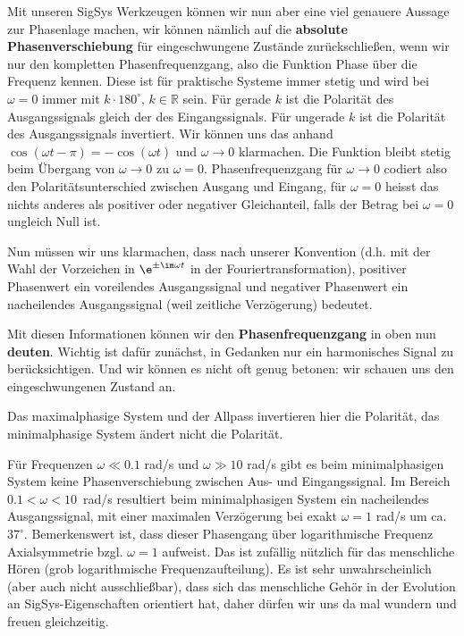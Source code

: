 \begin{Loesung}
Mit unseren SigSys Werkzeugen können wir nun aber eine viel genauere Aussage zur
Phasenlage machen, wir können nämlich auf die \textbf{absolute Phasenverschiebung}
für eingeschwungene Zustände zurückschließen, wenn wir nur den
kompletten Phasenfrequenzgang, also die Funktion Phase über die Frequenz kennen.
Diese ist für praktische Systeme immer stetig und wird bei $\omega=0$ immer mit
$k \cdot 180^\circ$, $k\in\mathbb{R}$ sein. Für gerade $k$ ist die Polarität
des Ausgangssignals gleich der des Eingangssignals. Für ungerade $k$ ist die
Polarität des Ausgangssignals invertiert.
Wir können uns das anhand $\cos(\omega t - \pi) = -\cos(\omega t)$ und $\omega\to 0$
klarmachen. Die Funktion bleibt stetig beim Übergang von $\omega\to 0$ zu $\omega=0$.
Phasenfrequenzgang für $\omega\to 0$ codiert also den Polaritätsunterschied
zwischen Ausgang und Eingang, für $\omega=0$ heisst das nichts anderes als
positiver oder negativer Gleichanteil, falls der Betrag bei $\omega=0$
ungleich Null ist.

Nun müssen wir uns klarmachen, dass nach unserer Konvention (d.h. mit der Wahl der
Vorzeichen in $\e^{\pm \im \omega t}$ in der Fouriertransformation),
positiver Phasenwert ein voreilendes Ausgangssignal und negativer Phasenwert
ein nacheilendes Ausgangssignal (weil zeitliche Verzögerung) bedeutet.

Mit diesen Informationen können wir den \textbf{Phasenfrequenzgang} in
 oben nun \textbf{deuten}. Wichtig ist dafür zunächst,
in Gedanken nur ein harmonisches Signal zu berücksichtigen.
Und wir können es nicht oft genug betonen: wir schauen uns den eingeschwungenen
Zustand an.

Das maximalphasige System und der Allpass invertieren hier die Polarität, das
minimalphasige System ändert nicht die Polarität.

Für Frequenzen $\omega\ll 0.1$ rad/s und $\omega\gg 10$ rad/s gibt es
beim minimalphasigen System keine Phasenverschiebung zwischen Aus- und Eingangssignal.
Im Bereich $0.1 < \omega < 10$~rad/s resultiert beim minimalphasigen System
ein nacheilendes Ausgangssignal,
mit einer maximalen Verzögerung bei exakt $\omega=1$ rad/s um ca. $37^\circ$.
Bemerkenswert ist, dass dieser Phasengang über logarithmische Frequenz Axialsymmetrie
bzgl. $\omega=1$ aufweist. Das ist zufällig nützlich für das menschliche Hören
(grob logarithmische Frequenzaufteilung).
Es ist sehr unwahrscheinlich (aber auch nicht ausschließbar),
dass sich das menschliche Gehör in der Evolution an SigSys-Eigenschaften
orientiert hat, daher dürfen wir uns da mal wundern und freuen gleichzeitig.


\end{Loesung}
